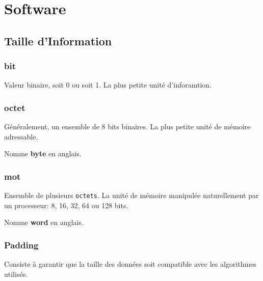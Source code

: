 \documentclass{article}
\begin{document}
\section{Software}


\subsection{Taille d'Information}
\subsubsection{bit}
\begin{definition}\label{def:bit}
    Valeur binaire, soit 0 ou soit 1. La plus petite unité d'inforamtion.
\end{definition}

\subsubsection{octet}
\begin{definition}\label{def:octet}
    Généralement, un ensemble de 8 bits binaires. La plus petite unité de mémoire adressable.
    
    \begin{remark}
        Nomme \textbf{byte} en anglais.
    \end{remark}
\end{definition}

\subsubsection{mot}
\begin{definition}\label{def:mot}
    Ensemble de plusieurs \texttt{octets}. La unité de mémoire manipulée naturellement par un processeur: 8, 16, 32, 64 ou 128 bits.

    \begin{remark}
        Nomme \textbf{word} en anglais.
    \end{remark}
\end{definition}

\subsubsection{Padding}
\begin{definition}\label{def:padding}
    Consiste à garantir que la taille des données soit compatible avec les algorithmes utilisés.
\end{definition}
\end{document}

